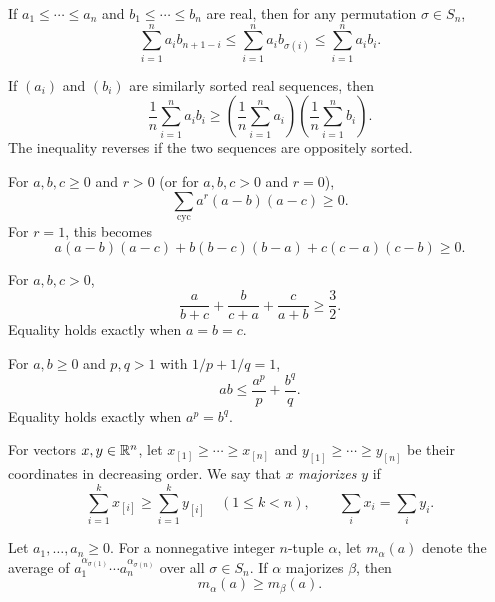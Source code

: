 \begin{theorem}
If $a_1\le\cdots\le a_n$ and $b_1\le\cdots\le b_n$ are real, then for any permutation $\sigma\in S_n$,
\[
 \sum_{i=1}^n a_ib_{n+1-i}
 \le\sum_{i=1}^n a_ib_{\sigma(i)}
 \le\sum_{i=1}^n a_ib_i.
\]
\end{theorem}

\begin{theorem}
If $(a_i)$ and $(b_i)$ are similarly sorted real sequences, then
\[
 \frac1n\sum_{i=1}^n a_ib_i
 \ge\left(\frac1n\sum_{i=1}^n a_i\right)
       \left(\frac1n\sum_{i=1}^n b_i\right).
\]
The inequality reverses if the two sequences are oppositely sorted.
\end{theorem}

\begin{theorem}
For $a, b, c\ge0$ and $r>0$ (or for $a, b, c>0$ and $r=0$),
\[
 \sum_{\mathrm{cyc}}a^r(a-b)(a-c)\ge0.
\]
For $r=1$, this becomes
\[
 a(a-b)(a-c)+b(b-c)(b-a)+c(c-a)(c-b)\ge0.
\]
\end{theorem}

\begin{theorem}
For $a, b, c>0$,
\[
 \frac{a}{b+c}+\frac{b}{c+a}+\frac{c}{a+b}\ge\frac32.
\]
Equality holds exactly when $a=b=c$.
\end{theorem}

\begin{theorem}
For $a, b\ge0$ and $p, q>1$ with $1/p+1/q=1$,
\[
 ab\le\frac{a^p}{p}+\frac{b^q}{q}.
\]
Equality holds exactly when $a^p=b^q$.
\end{theorem}

\begin{definition}[Majorization]
For vectors $x, y\in\mathbb{R}^n$, let $x_{[1]}\ge\cdots\ge x_{[n]}$ and $y_{[1]}\ge\cdots\ge y_{[n]}$ be their coordinates in decreasing order. We say that $x$ \emph{majorizes} $y$ if
\[
 \sum_{i=1}^k x_{[i]}\ge\sum_{i=1}^k y_{[i]}
 \quad(1\le k<n), \qquad \sum_i x_i=\sum_i y_i.
\]
\end{definition}

\begin{theorem}
Let $a_1, \dots, a_n\ge0$. For a nonnegative integer $n$-tuple $\alpha$, let $m_\alpha(a)$ denote the average of $a_1^{\alpha_{\sigma(1)}}\cdots a_n^{\alpha_{\sigma(n)}}$ over all $\sigma\in S_n$. If $\alpha$ majorizes $\beta$, then
\[
 m_\alpha(a)\ge m_\beta(a).
\]
\end{theorem}


